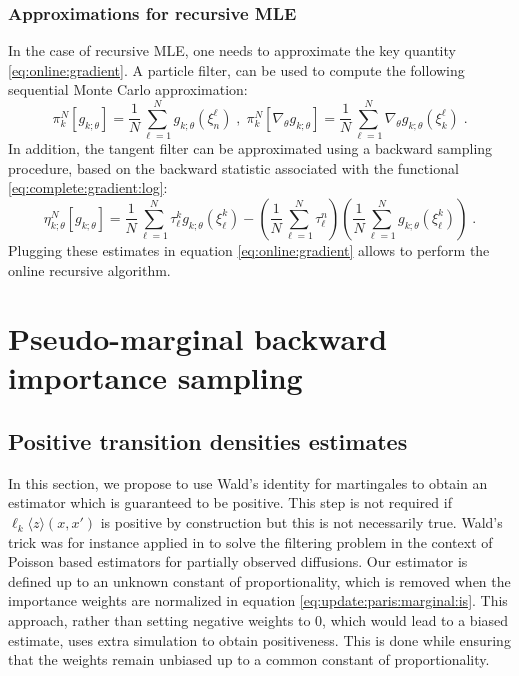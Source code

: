 \documentclass{article}
\newcommand{\md}[1]{g_{#1}}
\newcommand{\pred}[1]{\pi_{#1}}
\newcommand{\parvec}{\theta}
\newcommand{\deriv}{\nabla_{\parvec}}
\newcommand{\N}{N}
\newcommand{\eqsp}{\;}
\newcommand{\epart}[2]{\ensuremath{\xi_{#1}^{#2}}}
\newcommand{\kernelmarg}{\mathbf{R}}
\newcommand{\hatqg}[1]{\mathsf{\ell}_{#1}}
\begin{document}
\subsubsection*{Approximations for recursive MLE}

In the case of recursive MLE, one needs to approximate the key quantity \eqref{eq:online:gradient}.
A particle filter, can be used to compute the following sequential Monte Carlo approximation:
$$
\pred{k}^N[\md{k;\parvec}] = \frac{1}{N}\sum_{\ell = 1}^N \md{k;\parvec}(\epart{n}{\ell})\eqsp,\eqsp \pred{k}^N[\deriv \md{k;\parvec}] = \frac{1}{N}\sum_{\ell = 1}^N \deriv \md{k;\parvec}(\epart{k}{\ell})\eqsp.
$$
In addition, the tangent filter can be approximated using a backward sampling procedure, based on the backward statistic associated with  the functional \eqref{eq:complete:gradient:log}:
\begin{equation} 
\label{eq:tangent:identity:part:linear}
\eta_{k;\parvec}^{N}[\md{k;\parvec}] = \frac{1}{\N}\sum_{\ell=1}^\N\tau_\ell^k \md{k;\parvec}
(\epart{\ell}{k}) - \left(\frac{1}{\N}\sum_{\ell=1}^\N\tau_\ell^n\right)\left(\frac{1}{\N}\sum_{\ell=1}^\N \md{k;\parvec}(\epart{\ell}{k})\right)\eqsp.
\end{equation}
Plugging these estimates in equation \eqref{eq:online:gradient} allows to perform the online recursive algorithm. 


\section{Pseudo-marginal backward importance sampling}
\label{sec:backwardis}


\subsection{Positive transition densities estimates}
In this section, we propose to use Wald’s identity for martingales to obtain an  estimator which is guaranteed to be positive.  This step is not required if $\hatqg{k}\langle z\rangle(x,x')$ is positive by construction but this is not necessarily true.
 Wald's trick was for instance applied in \cite{fearnhead2010random} to solve the filtering problem in the context of Poisson based estimators for partially observed diffusions. Our estimator is defined up to an unknown constant of proportionality, which is removed when the importance weights are normalized in equation \eqref{eq:update:paris:marginal:is}. 
This approach, rather than setting negative weights to 0, which would lead to a biased estimate, uses extra simulation to obtain positiveness. 
This is done while ensuring that the weights remain unbiased up to a common constant of proportionality.%
\end{document}
